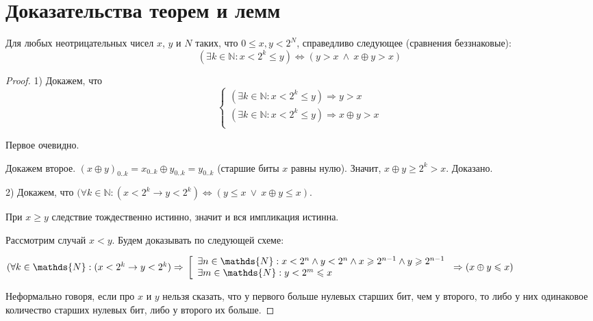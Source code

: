 \chapter{Доказательства теорем и лемм}\label{sec:proofs}

\begin{lemma}\label{QuantorElimination}
Для любых неотрицательных чисел $x$, $y$ и $N$ таких, что $0 \leqslant x, y < 2^N$, справедливо следующее (сравнения беззнаковые):
$$( \exists k \in \mathds{N} : x < 2^k \leqslant y ) \Leftrightarrow (y > x ~\wedge~ x \oplus y > x)$$
\end{lemma}
\begin{proof}
1) Докажем, что
$$\left\{\begin{array}{l}
( \exists k \in \mathds{N} : x < 2^k \leqslant y ) \Rightarrow y > x\\
( \exists k \in \mathds{N} : x < 2^k \leqslant y ) \Rightarrow  x \oplus y > x\\
\end{array}\right.$$

Первое очевидно.

Докажем второе. $(x \oplus y)_{0..k} = x_{0..k} \oplus y_{0..k} = y_{0..k}$ (старшие биты $x$ равны нулю). Значит, $x \oplus y \geqslant 2^k > x$. Доказано.

2) Докажем, что $( \forall k \in \mathds{N} : (x < 2^k \rightarrow y < 2^k ) \Leftrightarrow (y \leqslant x ~\vee~ x \oplus y \leqslant x)$.

При $x \geqslant y$ следствие тождественно истинно, значит и вся импликация истинна.

Рассмотрим случай $x < y$. Будем доказывать по следующей схеме:

$( \forall k \in \mathds{N} : (x < 2^k \rightarrow y < 2^k ) \Rightarrow\\
\left[\begin{array}{l}
\exists n \in \mathds{N} : x < 2^n \wedge y < 2^n \wedge x \geqslant 2^{n-1} \wedge y \geqslant 2^{n-1}\\
\exists m \in \mathds{N} : y < 2^m \leqslant x\\
\end{array}\right.
\Rightarrow (x \oplus y \leqslant x)$

Неформально говоря, если про $x$ и $y$ нельзя сказать, что у первого больше нулевых старших бит, чем у второго, то либо у них одинаковое количество старших нулевых бит, либо у второго их больше.


\end{proof}
